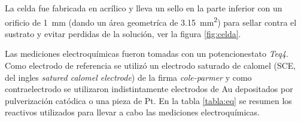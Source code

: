 	 La celda fue fabricada en acrílico y lleva un sello en la parte inferior con un orificio de \SI{1}{\mm} (dando un área geometríca de \SI{3.15}{\mm^{2}}) para sellar contra el sustrato y evitar perdidas de la solución, ver la figura \ref{fig:celda}. 
	
	 Las mediciones electroquímicas fueron tomadas con un potencionestato \textit{Teq4}. Como electrodo de referencia se utilizó un electrodo saturado de calomel (SCE, del ingles \textit{satured calomel electrode}) de la firma \textit{cole-parmer} y como contraelectrodo se utilizaron indistintamente electrodos de Au depositados por pulverización catódica o una pieza de Pt. En la tabla \ref{tabla:eq} se resumen los reactivos utilizados para llevar a cabo las mediciones electroquímicas. 

	 \newpage

